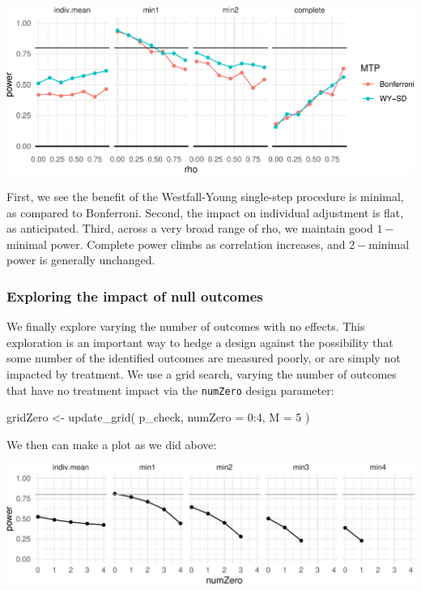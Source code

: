 \documentclass{article}
\newenvironment{Shaded}{\begin{snugshade}}{\end{snugshade}}
\newcommand{\AttributeTok}[1]{\textcolor[rgb]{0.77,0.63,0.00}{#1}}
\newcommand{\DecValTok}[1]{\textcolor[rgb]{0.00,0.00,0.81}{#1}}
\newcommand{\FunctionTok}[1]{\textcolor[rgb]{0.00,0.00,0.00}{#1}}
\newcommand{\NormalTok}[1]{#1}
\newcommand{\OtherTok}[1]{\textcolor[rgb]{0.56,0.35,0.01}{#1}}
\newcommand{\SpecialCharTok}[1]{\textcolor[rgb]{0.00,0.00,0.00}{#1}}
\begin{document}
\begin{center}\includegraphics{unnamed-chunk-14-1} \end{center}

First, we see the benefit of the Westfall-Young single-step procedure is
minimal, as compared to Bonferroni. Second, the impact on individual
adjustment is flat, as anticipated. Third, across a very broad range of
rho, we maintain good \(1-\)minimal power. Complete power climbs as
correlation increases, and \(2-\)minimal power is generally unchanged.

\subsubsection{Exploring the impact of null outcomes}

We finally explore varying the number of outcomes with no effects. This
exploration is an important way to hedge a design against the
possibility that some number of the identified outcomes are measured
poorly, or are simply not impacted by treatment. We use a grid search,
varying the number of outcomes that have no treatment impact via the
\texttt{numZero} design parameter:

\begin{Shaded}
\begin{Highlighting}[]
\NormalTok{gridZero }\OtherTok{\textless{}{-}} \FunctionTok{update\_grid}\NormalTok{( p\_check,}
                           \AttributeTok{numZero =} \DecValTok{0}\SpecialCharTok{:}\DecValTok{4}\NormalTok{,}
                         \AttributeTok{M =} \DecValTok{5}\NormalTok{ )}
\end{Highlighting}
\end{Shaded}

We then can make a plot as we did above:

\begin{center}\includegraphics{unnamed-chunk-17-1} \end{center}
\end{document}
